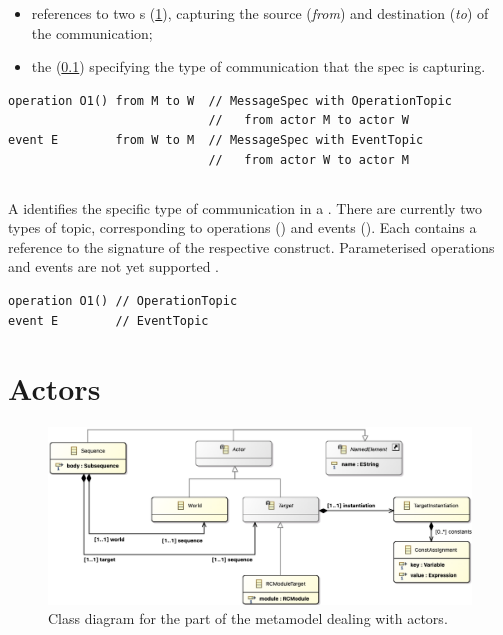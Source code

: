 \begin{itemize}
\item
	references to two \mactor s (\cref{sec:metamodel-actors}),
	capturing the source (\emph{from}) and destination (\emph{to})
	of the communication;
\item
	the \mmessagetopic{} (\cref{ssec:metamodel-messages-topics}) specifying
	the type of communication that the spec is capturing.
\end{itemize}

\begin{lstlisting}[style=Example]
operation O1() from M to W  // MessageSpec with OperationTopic
                            //   from actor M to actor W
event E        from W to M  // MessageSpec with EventTopic
                            //   from actor W to actor M
\end{lstlisting}

\subsection{\mmessagetopic}\label{ssec:metamodel-messages-topics}

A \mmessagetopic{} identifies the specific type of communication in a
\mmessagespec{}.  There are currently two types of topic, corresponding to
\robochart{} operations (\moperationtopic) and events (\meventtopic).
Each contains a reference to the signature of the respective construct.
Parameterised operations and events are not yet supported .

\begin{lstlisting}[style=Example]
operation O1() // OperationTopic
event E        // EventTopic
\end{lstlisting}


\section{Actors}\label{sec:metamodel-actors}

\begin{figure}
	\centering
	\includegraphics[width=\textwidth]{diagrams/actors.png}
	\caption{Class diagram for the part of the \langname{} metamodel dealing with actors.}
	\label{fig:metamodel-actors}
\end{figure}

